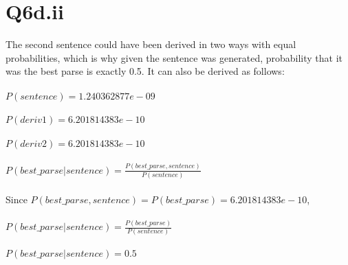 \documentclass[12pt]{article}
\begin{document}
\section*{Q6d.ii}
The second sentence could have been derived in two ways with equal probabilities, which is why given the sentence was generated, probability that it was the best parse is exactly 0.5. It can also be derived as follows:\\
\\
\(P(sentence) = 1.240362877e-09\)\\
\\
\(P(deriv1) = 6.201814383e-10\)\\
\\
\(P(deriv2) = 6.201814383e-10\)\\
\\
\(P(best\_parse|sentence) = \frac{P(best\_parse, sentence)}{P(sentence)}\)\\
\\
Since \(P(best\_parse, sentence) = P(best\_parse) = 6.201814383e-10\),\\
\\
\(P(best\_parse|sentence) = \frac{P(best\_parse)}{P(sentence)}\)\\
\\
\(P(best\_parse|sentence) = 0.5\)
\\
\end{document}
